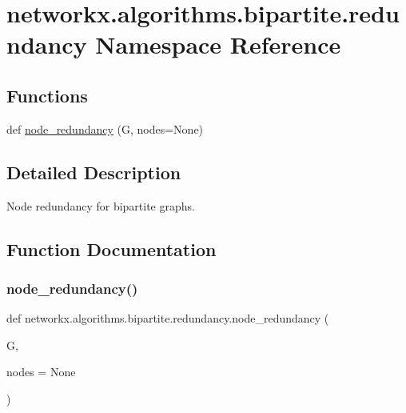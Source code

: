 \hypertarget{namespacenetworkx_1_1algorithms_1_1bipartite_1_1redundancy}{}\section{networkx.\+algorithms.\+bipartite.\+redundancy Namespace Reference}
\label{namespacenetworkx_1_1algorithms_1_1bipartite_1_1redundancy}
\subsection*{Functions}
\begin{DoxyCompactItemize}
\item 
def \hyperlink{namespacenetworkx_1_1algorithms_1_1bipartite_1_1redundancy_adc26f7de18e6d433e00976ca04e89e8d}{node\+\_\+redundancy} (G, nodes=None)
\end{DoxyCompactItemize}


\subsection{Detailed Description}
\begin{DoxyVerb}Node redundancy for bipartite graphs.\end{DoxyVerb}
 

\subsection{Function Documentation}
\mbox{\label{namespacenetworkx_1_1algorithms_1_1bipartite_1_1redundancy_adc26f7de18e6d433e00976ca04e89e8d}} 
\subsubsection{\texorpdfstring{node\+\_\+redundancy()}{node\_redundancy()}}
{\footnotesize\ttfamily def networkx.\+algorithms.\+bipartite.\+redundancy.\+node\+\_\+redundancy (\begin{DoxyParamCaption}\item[{}]{G,  }\item[{}]{nodes = {\ttfamily None} }\end{DoxyParamCaption})}

